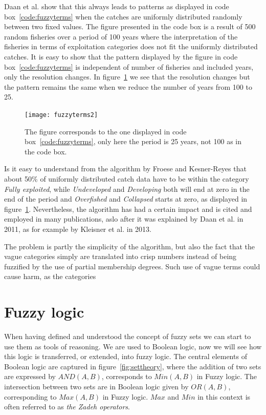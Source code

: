 \documentclass[11pt,fleqn]{book} %
\begin{document}
Daan et al. show that this always leads to patterns as displayed in code box~\ref{code:fuzzyterms} when the catches are uniformly distributed randomly between two fixed values. The figure presented in the code box is a result of 500 random fisheries over a period of 100 years where the interpretation of the fisheries in terms of exploitation categories does not fit the uniformly distributed catches. It is easy to show that the pattern displayed by the figure in code box~\ref{code:fuzzyterms} is independent of number of fisheries and included years, only the resolution changes. In figure~\ref{fig:fuzzyterms} we see that the resolution changes but the pattern remains the same when we reduce the number of years from 100 to 25.

\begin{figure}[ht]
\centering
\texttt{[image: fuzzyterms2]}
\caption{The figure corresponds to the one displayed in code box~\ref{code:fuzzyterms}, only here the period is 25 years, not 100 as in the code box.}
\label{fig:fuzzyterms}
\end{figure}

Is it easy to understand from the algorithm by Froese and Kesner-Reyes that about 50\% of uniformly distributed catch data have to be within the category \textit{Fully exploited}, while \textit{Undeveloped} and \textit{Developing} both will end at zero in the end of the period and \textit{Overfished} and \textit{Collapsed} starts at zero, as displayed in figure~\ref{fig:fuzzyterms}. Nevertheless, the algorithm has had a certain impact and is cited and employed in many publications, aslo after it was explained by Daan et al. in 2011\cite{Daan2011}, as for example by Kleisner et al. in 2013\cite{Kleisner2013}.

The problem is partly the simplicity of the algorithm, but also the fact that the vague categories simply are translated into crisp numbers instead of being fuzzified by the use of partial membership degrees. Such use of vague terms could cause harm, as the categories 

\section{Fuzzy logic}

When having defined and understood the concept of fuzzy sets we can start to use them as tools of reasoning. We are used to Boolean logic, now we will see how this logic is transferred, or extended, into fuzzy logic. The central elements of Boolean logic are captured in figure~\ref{fig:settheory}, where the addition of two sets are expressed by $AND(A, B)$, corresponds to $Min(A, B)$ in Fuzzy logic. The intersection between two sets are in Boolean logic given by $OR(A, B)$, corresponding to $Max(A, B)$ in Fuzzy logic. $Max$ and $Min$ in this context is often referred to as \textit{the Zadeh operators}.
\end{document}
